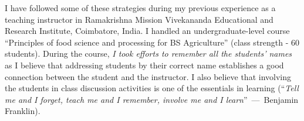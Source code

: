 \documentclass[11pt]{article}
\begin{document}
{%
%

\hspace{1em} I have followed some of these strategies during my previous experience as a teaching instructor in Ramakrishna Mission Vivekananda Educational and Research Institute, Coimbatore, India. I handled an undergraduate-level course ``Principles of food science and processing for BS Agriculture'' (class strength - 60 students). During the course, \emph{I took efforts to remember all the students' names} as I believe that addressing students by their correct name establishes a good connection between the student and the instructor. I also believe that involving the students in class discussion activities is one of the essentials in learning (“\emph{Tell me and I forget, teach me and I remember, involve me and I learn}”~---~Benjamin Franklin). 


}
\end{document}
